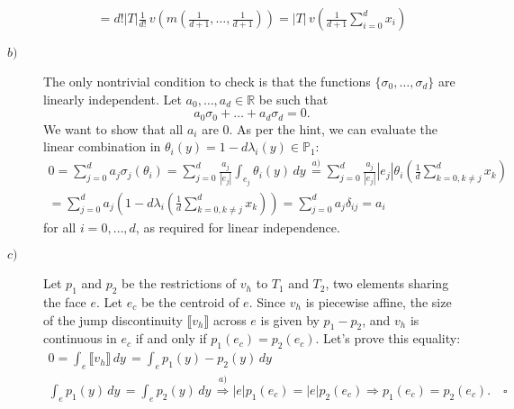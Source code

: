 \documentclass[a4paper]{article}
\newcommand{\abs}[1]{\left\lvert#1\right\rvert}
\newcommand{\dy}{\, dy \,}
\newcommand{\R}{\mathbb{R}}
\newcommand{\Pone}{\mathbb{P}_1}
\begin{document}
\begin{description}
\begin{gather*}
	= d!\abs{T} \frac{1}{d!} \,
		v\left(m\left(\frac{1}{d+1},\dots,\frac{1}{d+1}\right)\right)
	= \abs{T} \, v\left( \frac{1}{d+1} \sum_{i=0}^d x_i \right)
	\end{gather*}
\item[$b)$] The only nontrivial condition to check is that the functions
	$\{\sigma_0,\dots,\sigma_d\}$ are linearly independent.
	Let $a_0,\dots,a_d \in \R$ be such that
	\[
	a_0 \sigma_0 + \dots + a_d \sigma_d = 0.
	\]
	We want to show that all $a_i$ are 0. As per the hint, we can evaluate the
	linear combination in $\theta_i(y) = 1 - d \lambda_i(y) \in \Pone$:
	\begin{gather*}
	0 = \sum_{j=0}^d a_j \sigma_j(\theta_i)
	= \sum_{j=0}^d \frac{a_j}{\abs{e_j}} \int_{e_j} \theta_i(y) \dy
	\stackrel{a)}{=} \sum_{j=0}^d \frac{a_j}{\abs{e_j}} \abs{e_j}
		\theta_i \left( \frac{1}{d} \sum_{k=0,k \neq j}^d x_k \right) \\
	= \sum_{j=0}^d a_j \left(
		1 - d \lambda_i \left(
			\frac{1}{d} \sum_{k=0,k \neq j}^d x_k
		\right)
	\right)
	= \sum_{j=0}^d a_j \delta_{ij}
	= a_i
	\end{gather*}
	for all $i = 0,\dots,d$, as required for linear independence.
\item[$c)$] Let $p_1$ and $p_2$ be the restrictions of $v_h$ to $T_1$ and $T_2$,
	two elements sharing the face $e$. Let $e_c$ be the centroid of $e$.
	Since $v_h$ is piecewise affine,	the size of the jump discontinuity
	$\llbracket v_h \rrbracket$ across $e$ is given by $p_1 - p_2$, and
	$v_h$ is continuous in $e_c$ if and only if $p_1(e_c) = p_2(e_c)$.
	Let's prove this equality:
	\begin{gather*}
	0 = \int_e \llbracket v_h \rrbracket \dy
	= \int_e p_1(y) - p_2(y) \dy \\
	\int_e p_1(y) \dy = \int_e p_2(y) \dy
	\stackrel{a)}{\Rightarrow} \abs{e} p_1(e_c) = \abs{e} p_2(e_c)
	\Rightarrow p_1(e_c) = p_2(e_c). \quad \square
	\end{gather*}
\end{description}
\end{document}
